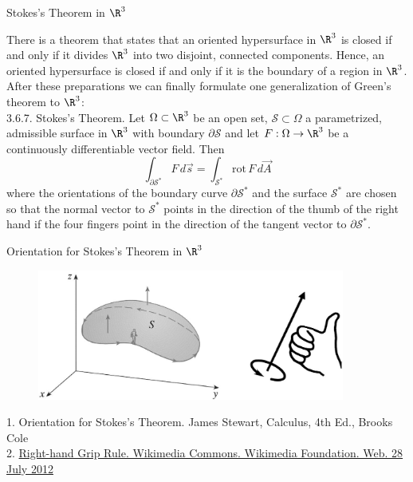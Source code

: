 \documentclass[smaller,hyperref={CJKbookmarks=true}]{beamer}
\begin{document}
\begin{frame}[t]{Stokes's Theorem in $\R^3$}
\begin{spacing}{1}
There is a theorem that states that an oriented hypersurface in $\R^3$ is
closed if and only if it divides $\R^3$ into two disjoint, connected components.
Hence, an oriented hypersurface is closed if and only if it is the boundary
of a region in $\R^3$.\\[4pt]
After these preparations we can finally formulate one generalization of
Green's theorem to $\R^3$:\\[3pt]
\alert{3.6.7. Stokes's Theorem.} Let $\Omega\subset\R^3$ be an open set, $\mathcal{S}\subset\Omega$ a parametrized, admissible surface in $\R^3$ with boundary $\partial\mathcal{S}$ and let $F:\Omega\to\R^3$ be a continuously dif{}ferentiable vector field. Then
\[\int_{\partial\mathcal{S}^*}F\,d\vec{s}=
\int_{\mathcal{S}^*}\text{rot}\,F\,d\vec{A}\]
where the orientations of the boundary curve $\partial\mathcal{S}^*$ and the surface $\mathcal{S}^*$ are chosen so that the normal vector to $\mathcal{S}^*$ points in the direction of the
thumb of the right hand if the four fingers point in the direction of the
tangent vector to $\partial\mathcal{S}^*$.
\end{spacing}
\end{frame}
\begin{frame}[t]{Orientation for Stokes's Theorem in $\R^3$}
\begin{figure}
  \centering
  \includegraphics[width=0.9\textwidth]{81.jpg}

\end{figure}
\vspace*{8pt}
\begin{flushleft}
\begin{tiny}
1. Orientation for Stokes's Theorem. James Stewart, Calculus, 4th Ed., Brooks Cole\\
2. \href{https://commons.wikimedia.org/wiki/File:Right-hand_grip_rule.svg}{Right-hand Grip Rule. Wikimedia Commons. Wikimedia
Foundation. Web. 28 July 2012}
\end{tiny}
\end{flushleft}
\end{frame}
\end{document}
